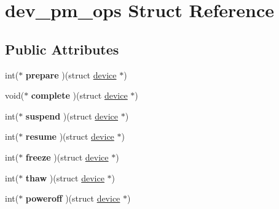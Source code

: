 \hypertarget{structdev__pm__ops}{}\section{dev\+\_\+pm\+\_\+ops Struct Reference}
\label{structdev__pm__ops}
\subsection*{Public Attributes}
\begin{DoxyCompactItemize}
\item 
\hypertarget{structdev__pm__ops_aff05a7308bd1a49ece6a80d01b939a93}{}int($\ast$ {\bfseries prepare} )(struct \hyperlink{structdevice}{device} $\ast$)\label{structdev__pm__ops_aff05a7308bd1a49ece6a80d01b939a93}

\item 
\hypertarget{structdev__pm__ops_a7c3ba4cc75b27ec271df6d41eac6643a}{}void($\ast$ {\bfseries complete} )(struct \hyperlink{structdevice}{device} $\ast$)\label{structdev__pm__ops_a7c3ba4cc75b27ec271df6d41eac6643a}

\item 
\hypertarget{structdev__pm__ops_ad0aca836a0cf218c6d9c31b2f332221d}{}int($\ast$ {\bfseries suspend} )(struct \hyperlink{structdevice}{device} $\ast$)\label{structdev__pm__ops_ad0aca836a0cf218c6d9c31b2f332221d}

\item 
\hypertarget{structdev__pm__ops_a2da853588778353447d44555c840b610}{}int($\ast$ {\bfseries resume} )(struct \hyperlink{structdevice}{device} $\ast$)\label{structdev__pm__ops_a2da853588778353447d44555c840b610}

\item 
\hypertarget{structdev__pm__ops_a6e606c1af5d88eda5b72d0b4f29afd44}{}int($\ast$ {\bfseries freeze} )(struct \hyperlink{structdevice}{device} $\ast$)\label{structdev__pm__ops_a6e606c1af5d88eda5b72d0b4f29afd44}

\item 
\hypertarget{structdev__pm__ops_a642adb8f11897326408fac4e0f2da589}{}int($\ast$ {\bfseries thaw} )(struct \hyperlink{structdevice}{device} $\ast$)\label{structdev__pm__ops_a642adb8f11897326408fac4e0f2da589}

\item 
\hypertarget{structdev__pm__ops_a1ba88769633befc5cd04214be75fbf8f}{}int($\ast$ {\bfseries poweroff} )(struct \hyperlink{structdevice}{device} $\ast$)\label{structdev__pm__ops_a1ba88769633befc5cd04214be75fbf8f}


\end{DoxyCompactItemize}
